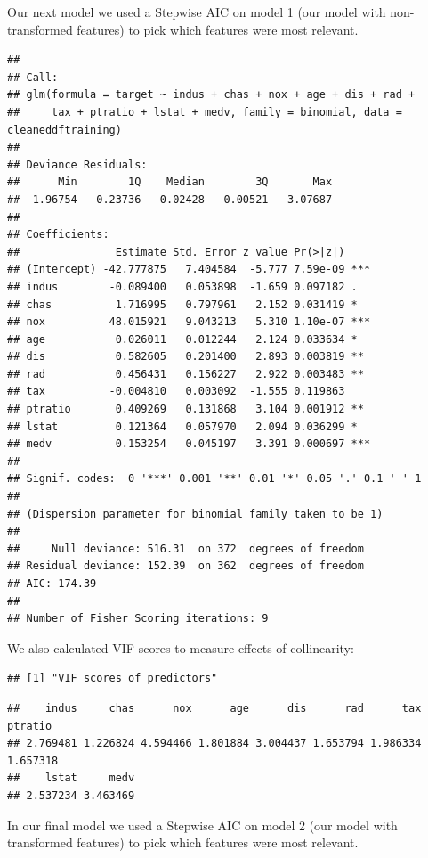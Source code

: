 \documentclass[
]{article}
\begin{document}
Our next model we used a Stepwise AIC on model 1 (our model with
non-transformed features) to pick which features were most relevant.

\begin{verbatim}
## 
## Call:
## glm(formula = target ~ indus + chas + nox + age + dis + rad + 
##     tax + ptratio + lstat + medv, family = binomial, data = cleaneddftraining)
## 
## Deviance Residuals: 
##      Min        1Q    Median        3Q       Max  
## -1.96754  -0.23736  -0.02428   0.00521   3.07687  
## 
## Coefficients:
##               Estimate Std. Error z value Pr(>|z|)    
## (Intercept) -42.777875   7.404584  -5.777 7.59e-09 ***
## indus        -0.089400   0.053898  -1.659 0.097182 .  
## chas          1.716995   0.797961   2.152 0.031419 *  
## nox          48.015921   9.043213   5.310 1.10e-07 ***
## age           0.026011   0.012244   2.124 0.033634 *  
## dis           0.582605   0.201400   2.893 0.003819 ** 
## rad           0.456431   0.156227   2.922 0.003483 ** 
## tax          -0.004810   0.003092  -1.555 0.119863    
## ptratio       0.409269   0.131868   3.104 0.001912 ** 
## lstat         0.121364   0.057970   2.094 0.036299 *  
## medv          0.153254   0.045197   3.391 0.000697 ***
## ---
## Signif. codes:  0 '***' 0.001 '**' 0.01 '*' 0.05 '.' 0.1 ' ' 1
## 
## (Dispersion parameter for binomial family taken to be 1)
## 
##     Null deviance: 516.31  on 372  degrees of freedom
## Residual deviance: 152.39  on 362  degrees of freedom
## AIC: 174.39
## 
## Number of Fisher Scoring iterations: 9
\end{verbatim}

We also calculated VIF scores to measure effects of collinearity:

\begin{verbatim}
## [1] "VIF scores of predictors"
\end{verbatim}

\begin{verbatim}
##    indus     chas      nox      age      dis      rad      tax  ptratio 
## 2.769481 1.226824 4.594466 1.801884 3.004437 1.653794 1.986334 1.657318 
##    lstat     medv 
## 2.537234 3.463469
\end{verbatim}

In our final model we used a Stepwise AIC on model 2 (our model with
transformed features) to pick which features were most relevant.
\end{document}
